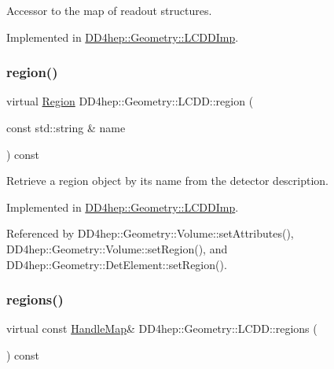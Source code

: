 Accessor to the map of readout structures. 



Implemented in \hyperlink{class_d_d4hep_1_1_geometry_1_1_l_c_d_d_imp_a5967ac2419cccd4b5ab3e9f210dca2ab}{D\+D4hep\+::\+Geometry\+::\+L\+C\+D\+D\+Imp}.

\hypertarget{class_d_d4hep_1_1_geometry_1_1_l_c_d_d_adbe06759881707fe995472c03810c0ff}{}\label{class_d_d4hep_1_1_geometry_1_1_l_c_d_d_adbe06759881707fe995472c03810c0ff} 
\subsubsection{\texorpdfstring{region()}{region()}}
{\footnotesize\ttfamily virtual \hyperlink{class_d_d4hep_1_1_geometry_1_1_region}{Region} D\+D4hep\+::\+Geometry\+::\+L\+C\+D\+D\+::region (\begin{DoxyParamCaption}\item[{const std\+::string \&}]{name }\end{DoxyParamCaption}) const\hspace{0.3cm}{\ttfamily [pure virtual]}}



Retrieve a region object by it\textquotesingle{}s name from the detector description. 



Implemented in \hyperlink{class_d_d4hep_1_1_geometry_1_1_l_c_d_d_imp_a5c4444654f7c48fde9b12bb9ea06c663}{D\+D4hep\+::\+Geometry\+::\+L\+C\+D\+D\+Imp}.



Referenced by D\+D4hep\+::\+Geometry\+::\+Volume\+::set\+Attributes(), D\+D4hep\+::\+Geometry\+::\+Volume\+::set\+Region(), and D\+D4hep\+::\+Geometry\+::\+Det\+Element\+::set\+Region().

\hypertarget{class_d_d4hep_1_1_geometry_1_1_l_c_d_d_ab068e5aaa1d76a2348ea74ea3d76f96f}{}\label{class_d_d4hep_1_1_geometry_1_1_l_c_d_d_ab068e5aaa1d76a2348ea74ea3d76f96f} 
\subsubsection{\texorpdfstring{regions()}{regions()}}
{\footnotesize\ttfamily virtual const \hyperlink{class_d_d4hep_1_1_geometry_1_1_l_c_d_d_a05cb11e7355772c7b0794bcca59bf477}{Handle\+Map}\& D\+D4hep\+::\+Geometry\+::\+L\+C\+D\+D\+::regions (\begin{DoxyParamCaption}{ }\end{DoxyParamCaption}) const\hspace{0.3cm}{\ttfamily [pure virtual]}}



